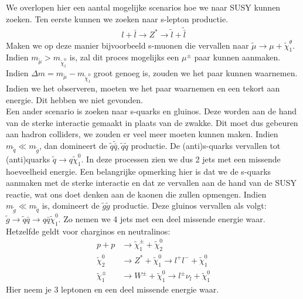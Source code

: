 \documentclass[../main.tex]{subfiles}
\begin{document}
We overlopen hier een aantal mogelijke scenarios hoe we naar SUSY kunnen zoeken. Ten eerste kunnen we zoeken naar s-lepton productie.
\begin{equation}
    \begin{aligned}
        \label{eq:slepton_productie}
        l+\bar{l} \rightarrow Z^{*} \rightarrow \tilde{l}+\tilde{\bar{l}}
    \end{aligned}
\end{equation}
Maken we op deze manier bijvoorbeeld s-muonen die vervallen naar $\tilde{\mu} \rightarrow \mu+\tilde{\chi}_{1}^{\theta}$. Indien $m_{\tilde{\mu}}>m_{\tilde{\chi}_{1}^{0}}$ is, zal dit proces mogelijks een $\mu^\pm$ paar kunnen aanmaken. Indien $\Delta m=m_{\tilde{\mu}}-m_{\tilde{\chi}_{1}^{0}}$ groot genoeg is, zouden we het paar kunnen waarnemen. Indien we het observeren, moeten we het paar waarnemen en een tekort aan energie. Dit hebben we niet gevonden.\\
Een ander scenario is zoeken naar s-quarks en gluinos. Deze worden aan de hand van de sterke interactie gemaakt in plaats van de zwakke. Dit moet dus gebeuren aan hadron colliders, we zouden er veel meer moeten kunnen maken. Indien $m_{\tilde{q}} \ll m_{\tilde{g}}$, dan domineert de $\tilde{q} \tilde{\bar{q}}, \tilde{q} \tilde{q}$ productie. De (anti)s-quarks vervallen tot (anti)quarks $\tilde{q} \rightarrow q \tilde{\chi}_{1}^{0}$. In deze processen zien we dus 2 jets met een missende hoeveelheid energie. Een belangrijke opmerking hier is dat we de s-quarks aanmaken met de sterke interactie en dat ze vervallen aan de hand van de SUSY reactie, wat ons doet denken aan de kaonen die zullen opmengen. Indien $m_{\tilde{g}} \ll m_{\tilde{q}}$ is, domineert de $\tilde{g} \tilde{g}$ productie. Deze gluinos vervallen als volgt: $\tilde{g} \rightarrow \tilde{q} \bar{q} \rightarrow q \bar{q} \tilde{\chi}_{1}^{0}$. Zo nemen we 4 jets met een deel missende energie waar.\\
Hetzelfde geldt voor charginos en neutralinos:
\begin{equation}
    \begin{aligned}
        \label{eq:char_neutr_prod}
        p+p & \rightarrow \tilde{\chi}_{1}^{\pm}+\tilde{\chi}_{2}^{0} \\
        \tilde{\chi}_{2}^{0} & \rightarrow Z^{*}+\tilde{\chi}_{1}^{0} \rightarrow l^{+} l^{-}+\tilde{\chi}_{1}^{0} \\
        \tilde{\chi}_{1}^{\pm} & \rightarrow W^{\pm}+\tilde{\chi}_{1}^{0} \rightarrow l^{\pm} \nu_{l}+\tilde{\chi}_{1}^{0}
    \end{aligned}
\end{equation}
Hier neem je 3 leptonen en een deel missende energie waar.
\end{document}
